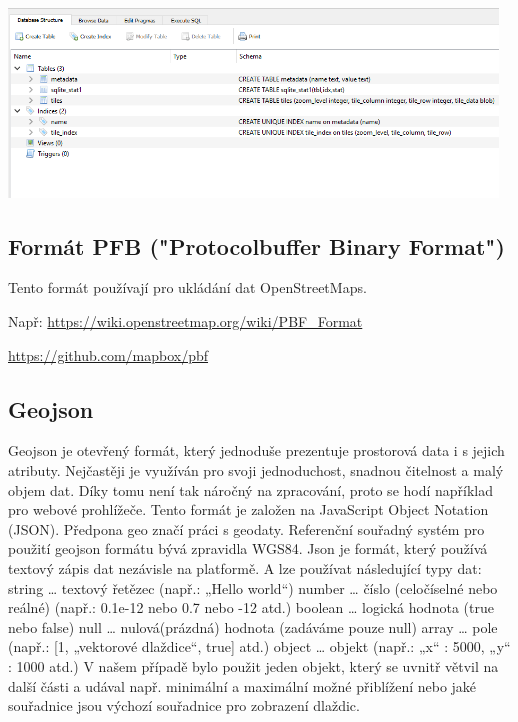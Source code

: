 \documentclass[12pt]{article}
\begin{document}
\begin{center}
	\includegraphics[width=13cm]{./img/mbtiles_db_structure.png}
\end{center}

\subsection{Formát PFB ("Protocolbuffer Binary Format")}
Tento formát používají pro ukládání dat OpenStreetMaps.

Např: \url{https://wiki.openstreetmap.org/wiki/PBF_Format}

\url{https://github.com/mapbox/pbf}

\subsection{Geojson}
Geojson je otevřený formát, který jednoduše prezentuje prostorová data i s jejich atributy. Nejčastěji je využíván pro svoji jednoduchost, snadnou čitelnost a malý objem dat. Díky tomu není tak náročný na zpracování, proto se hodí například pro webové prohlížeče.
Tento formát je založen na JavaScript Object Notation (JSON). Předpona geo značí práci s geodaty. Referenční souřadný systém pro použití geojson formátu bývá zpravidla WGS84. Json je formát, který používá textový zápis dat nezávisle na platformě. A lze používat následující typy dat:
\newline string … textový řetězec (např.: „Hello world“)
\newline number … číslo (celočíselné nebo reálné) (např.: 0.1e-12 nebo 0.7 nebo -12 atd.)
\newline boolean … logická hodnota (true nebo false)
\newline null … nulová(prázdná) hodnota (zadáváme pouze null)
\newline array … pole (např.: [1, „vektorové dlaždice“, true] atd.)
\newline object … objekt (např.: {„x“ : 5000, „y“ : 1000} atd.)
\newline
\newline  V našem případě bylo použit jeden objekt, který se uvnitř větvil na další části a udával např. minimální a maximální možné přiblížení nebo jaké souřadnice jsou výchozí souřadnice pro zobrazení dlaždic.
\end{document}
